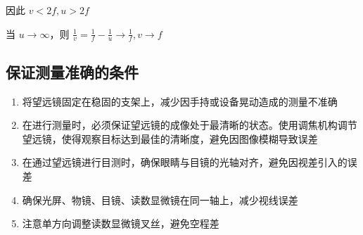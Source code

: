 \documentclass[UTF8]{ctexart}
\begin{document}
因此 $ v < 2f, u > 2f$

当 $u \to \infty $，则 $\frac{1}{v} = \frac{1}{f} - \frac{1}{u} \to  \frac{1}{f}, v \to f$

\subsection{保证测量准确的条件}
\begin{enumerate}
    \item 将望远镜固定在稳固的支架上，减少因手持或设备晃动造成的测量不准确
    \item 在进行测量时，必须保证望远镜的成像处于最清晰的状态。使用调焦机构调节望远镜，使得观察目标达到最佳的清晰度，避免因图像模糊导致误差
    \item 在通过望远镜进行目测时，确保眼睛与目镜的光轴对齐，避免因视差引入的误差
    \item 确保光屏、物镜、目镜、读数显微镜在同一轴上，减少视线误差
    \item 注意单方向调整读数显微镜叉丝，避免空程差
\end{enumerate}
\end{document}
